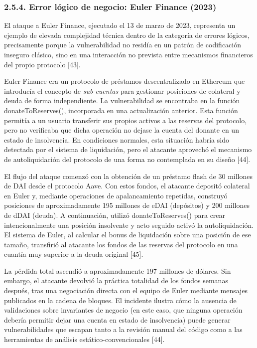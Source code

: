 \subsubsection{2.5.4. Error lógico de negocio: Euler Finance
(2023)}\label{error-luxf3gico-de-negocio-euler-finance-2023}

El ataque a Euler Finance, ejecutado el 13 de marzo de 2023, representa
un ejemplo de elevada complejidad técnica dentro de la categoría de
errores lógicos, precisamente porque la vulnerabilidad no residía en un
patrón de codificación inseguro clásico, sino en una interacción no
prevista entre mecanismos financieros del propio protocolo {[}43{]}.

Euler Finance era un protocolo de préstamos descentralizado en Ethereum
que introducía el concepto de \emph{sub-cuentas} para gestionar
posiciones de colateral y deuda de forma independiente. La
vulnerabilidad se encontraba en la función donateToReserves(),
incorporada en una actualización anterior. Esta función permitía a un
usuario transferir sus propios activos a las reservas del protocolo,
pero no verificaba que dicha operación no dejase la cuenta del donante
en un estado de insolvencia. En condiciones normales, esta situación
habría sido detectada por el sistema de liquidación, pero el atacante
aprovechó el mecanismo de autoliquidación del protocolo de una forma no
contemplada en su diseño {[}44{]}.

El flujo del ataque comenzó con la obtención de un préstamo flash de 30
millones de DAI desde el protocolo Aave. Con estos fondos, el atacante
depositó colateral en Euler y, mediante operaciones de apalancamiento
repetidas, construyó posiciones de aproximadamente 195 millones de eDAI
(depósitos) y 200 millones de dDAI (deuda). A continuación, utilizó
donateToReserves() para crear intencionalmente una posición insolvente y
acto seguido activó la autoliquidación. El sistema de Euler, al calcular
el bonus de liquidación sobre una posición de ese tamaño, transfirió al
atacante los fondos de las reservas del protocolo en una cuantía muy
superior a la deuda original {[}45{]}.

La pérdida total ascendió a aproximadamente 197 millones de dólares. Sin
embargo, el atacante devolvió la práctica totalidad de los fondos
semanas después, tras una negociación directa con el equipo de Euler
mediante mensajes publicados en la cadena de bloques. El incidente
ilustra cómo la ausencia de validaciones sobre invariantes de negocio
(en este caso, que ninguna operación debería permitir dejar una cuenta
en estado de insolvencia) puede generar vulnerabilidades que escapan
tanto a la revisión manual del código como a las herramientas de
análisis estático-convencionales {[}44{]}.
